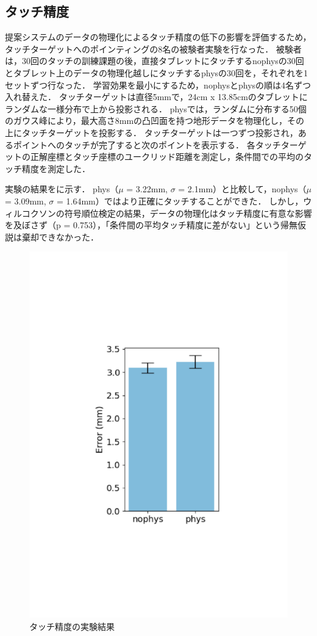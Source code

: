 \documentclass[a4paper,10pt,twocolumn,uplatex]{jsarticle}
\begin{document}
\subsection{タッチ精度}
提案システムのデータの物理化によるタッチ精度の低下の影響を評価するため，タッチターゲットへのポインティングの8名の被験者実験を行なった．
被験者は，30回のタッチの訓練課題の後，直接タブレットにタッチするnophysの30回とタブレット上のデータの物理化越しにタッチするphysの30回を，それぞれを1セットずつ行なった．
学習効果を最小にするため，nophysとphysの順は4名ずつ入れ替えた．
タッチターゲットは直径5mmで，24cm x 13.85cmのタブレットにランダムな一様分布で上から投影される．
physでは，ランダムに分布する50個のガウス峰により，最大高さ8mmの凸凹面を持つ地形データを物理化し，その上にタッチターゲットを投影する．
タッチターゲットは一つずつ投影され，あるポイントへのタッチが完了すると次のポイントを表示する．
各タッチターゲットの正解座標とタッチ座標のユークリッド距離を測定し，条件間での平均のタッチ精度を測定した．\par
実験の結果をに示す．
phys（$\mu$ = 3.22mm, $\sigma$ = 2.1mm）と比較して，nophys（$\mu$ = 3.09mm, $\sigma$ = 1.64mm）ではより正確にタッチすることができた．
しかし，ウィルコクソンの符号順位検定の結果，データの物理化はタッチ精度に有意な影響を及ぼさず（p = 0.753），「条件間の平均タッチ精度に差がない」という帰無仮説は棄却できなかった．

\begin{figure}[t]
	\begin{centering}
    \includegraphics[width=0.35\linewidth]{img/touch.pdf}
    \caption{タッチ精度の実験結果}
    \label{fig:touch}
    \end{centering}
\end{figure}
\end{document}
